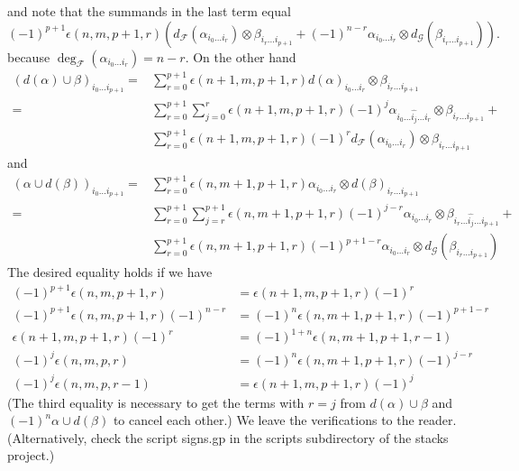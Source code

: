 and note that the summands in the last term equal
$$
(-1)^{p + 1} \epsilon(n, m, p + 1, r)
\left(
d_{\mathcal F}(\alpha_{i_0 \ldots i_r}) \otimes 
\beta_{i_r \ldots i_{p + 1}} +
(-1)^{n - r}
\alpha_{i_0 \ldots i_r} \otimes d_{\mathcal G}(\beta_{i_r \ldots i_{p + 1}})
\right).
$$
because $\deg_\mathcal{F}(\alpha_{i_0 \ldots i_r}) = n - r$.
On the other hand
\begin{align*}
(d(\alpha) \cup \beta)_{i_0\ldots i_{p + 1}}
= &
\sum\nolimits_{r = 0}^{p + 1}
\epsilon(n + 1, m, p + 1, r)
d(\alpha)_{i_0\ldots i_r} \otimes \beta_{i_r\ldots i_{p + 1}}
\\
= &
\sum\nolimits_{r = 0}^{p + 1}
\sum\nolimits_{j = 0}^{r}
\epsilon(n + 1, m, p + 1, r) (-1)^j
\alpha_{i_0\ldots\hat{i_j}\ldots i_r} \otimes \beta_{i_r\ldots i_{p + 1}}
+ \\
&
\sum\nolimits_{r = 0}^{p + 1}
\epsilon(n + 1, m, p + 1, r) (-1)^r
d_{\mathcal F}(\alpha_{i_0 \ldots i_r}) \otimes \beta_{i_r\ldots i_{p + 1}}
\end{align*}
and
\begin{align*}
(\alpha \cup d(\beta))_{i_0\ldots i_{p + 1}}
= &
\sum\nolimits_{r = 0}^{p + 1}
\epsilon(n, m + 1, p + 1, r)
\alpha_{i_0 \ldots i_r} \otimes d(\beta)_{i_r \ldots i_{p + 1}}
\\
= &
\sum\nolimits_{r = 0}^{p + 1}
\sum\nolimits_{j = r}^{p + 1}
\epsilon(n, m + 1, p + 1, r) (-1)^{j - r}
\alpha_{i_0 \ldots i_r} \otimes \beta_{i_r \ldots \hat{i_j}\ldots i_{p + 1}}
+ \\
&
\sum\nolimits_{r = 0}^{p + 1}
\epsilon(n, m + 1, p + 1, r) (-1)^{p + 1 - r}
\alpha_{i_0 \ldots i_r} \otimes d_{\mathcal G}(\beta_{i_r \ldots i_{p + 1}})
\end{align*}
The desired equality holds if we have
\begin{align*}
(-1)^{p + 1} \epsilon(n, m, p + 1, r)
& =
\epsilon(n + 1, m, p + 1, r) (-1)^r \\
(-1)^{p + 1} \epsilon(n, m, p + 1, r) (-1)^{n - r}
& =
(-1)^n \epsilon(n, m + 1, p + 1, r) (-1)^{p + 1 - r} \\
\epsilon(n + 1, m, p + 1, r) (-1)^r
& =
(-1)^{1 + n} \epsilon(n, m + 1, p + 1, r - 1) \\
(-1)^j \epsilon(n, m, p, r)
& =
(-1)^n \epsilon(n, m + 1, p + 1, r) (-1)^{j - r} \\
(-1)^j \epsilon(n, m, p, r - 1)
& =
\epsilon(n + 1, m, p + 1, r) (-1)^j
\end{align*}
(The third equality is necessary to get the terms with $r = j$
from $d(\alpha) \cup \beta$ and $(-1)^n \alpha \cup d(\beta)$
to cancel each other.) We leave the verifications to the reader.
(Alternatively, check the script signs.gp in the scripts subdirectory
of the stacks project.)

